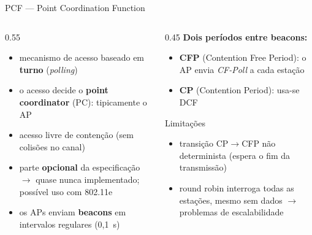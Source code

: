 \documentclass[aspectratio=169,11pt]{beamer}
\begin{document}
\begin{frame}{PCF --- Point Coordination Function}
  \begin{columns}
    \begin{column}{0.55\textwidth}
      \begin{itemize}
        \item mecanismo de acesso baseado em \textbf{turno} (\emph{polling})
        \item o acesso decide o \textbf{point coordinator} (PC): tipicamente o AP
        \item acesso livre de contenção (sem colisões no canal)
        \item parte \textbf{opcional} da especificação $\rightarrow$ quase nunca implementado; possível uso com 802.11e
        \item os APs enviam \textbf{beacons} em intervalos regulares (0,1~s)
      \end{itemize}
    \end{column}
    \begin{column}{0.45\textwidth}
      \textbf{Dois períodos entre beacons:}
      \begin{itemize}
        \item \textbf{CFP} (Contention Free Period): o AP envia \emph{CF-Poll} a cada estação
        \item \textbf{CP} (Contention Period): usa-se DCF
      \end{itemize}
      \begin{alertblock}{Limitações}
        \begin{itemize}
          \item transição CP$\to$CFP não determinista (espera o fim da transmissão)
          \item round robin interroga todas as estações, mesmo sem dados $\rightarrow$ problemas de escalabilidade
        \end{itemize}
      \end{alertblock}
    \end{column}
  \end{columns}
\end{frame}
\end{document}

